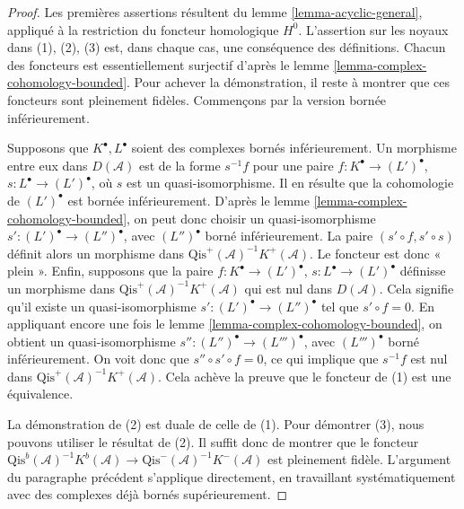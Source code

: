 \begin{proof}
Les premières assertions résultent du lemme \ref{lemma-acyclic-general},
appliqué à la restriction du foncteur homologique $H^0$. L'assertion sur les
noyaux dans (1), (2), (3) est, dans chaque cas, une conséquence des
définitions. Chacun des foncteurs est essentiellement surjectif d'après le
lemme \ref{lemma-complex-cohomology-bounded}. Pour achever la démonstration,
il reste à montrer que ces foncteurs sont pleinement fidèles. Commençons par la
version bornée inférieurement.

\medskip\noindent
Supposons que $K^\bullet, L^\bullet$ soient des complexes bornés
inférieurement. Un morphisme entre eux dans $D(\mathcal{A})$ est de la forme
$s^{-1}f$ pour une paire
$f : K^\bullet \to (L')^\bullet$, $s : L^\bullet \to (L')^\bullet$, où $s$
est un quasi-isomorphisme. Il en résulte que la cohomologie de $(L')^\bullet$
est bornée inférieurement. D'après le
lemme \ref{lemma-complex-cohomology-bounded}, on peut donc choisir un
quasi-isomorphisme $s' : (L')^\bullet \to (L'')^\bullet$, avec
$(L'')^\bullet$ borné inférieurement. La paire
$(s' \circ f, s' \circ s)$ définit alors un morphisme dans
$\text{Qis}^{+}(\mathcal{A})^{-1}K^{+}(\mathcal{A})$. Le foncteur est donc
« plein ». Enfin, supposons que la paire
$f : K^\bullet \to (L')^\bullet$, $s : L^\bullet \to (L')^\bullet$ définisse
un morphisme dans $\text{Qis}^{+}(\mathcal{A})^{-1}K^{+}(\mathcal{A})$ qui est
nul dans $D(\mathcal{A})$. Cela signifie qu'il existe un quasi-isomorphisme
$s' : (L')^\bullet \to (L'')^\bullet$ tel que $s' \circ f = 0$. En appliquant
encore une fois le lemme \ref{lemma-complex-cohomology-bounded}, on obtient un
quasi-isomorphisme $s'' : (L'')^\bullet \to (L''')^\bullet$, avec
$(L''')^\bullet$ borné inférieurement. On voit donc que
$s'' \circ s' \circ f = 0$, ce qui implique que $s^{-1}f$ est nul dans
$\text{Qis}^{+}(\mathcal{A})^{-1}K^{+}(\mathcal{A})$. Cela achève la preuve
que le foncteur de (1) est une équivalence.

\medskip\noindent
La démonstration de (2) est duale de celle de (1). Pour démontrer (3), nous
pouvons utiliser le résultat de (2). Il suffit donc de montrer que le foncteur
$\text{Qis}^b(\mathcal{A})^{-1}K^b(\mathcal{A})
\to \text{Qis}^{-}(\mathcal{A})^{-1}K^{-}(\mathcal{A})$ est pleinement
fidèle. L'argument du paragraphe précédent s'applique directement, en
travaillant systématiquement avec des complexes déjà bornés supérieurement.
\end{proof}








